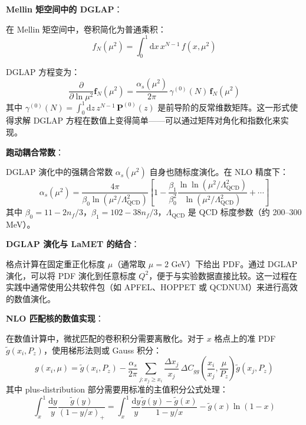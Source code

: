 \documentclass[11pt,a4paper]{ctexart}
\begin{document}
\textbf{Mellin 矩空间中的 DGLAP}：

在 Mellin 矩空间中，卷积简化为普通乘积：
\begin{equation}
f_N(\mu^2) = \int_0^1 \mathrm{d}x \, x^{N-1} \, f(x, \mu^2)
\end{equation}

DGLAP 方程变为：
\begin{equation}
\frac{\partial}{\partial \ln \mu^2} \mathbf{f}_N(\mu^2) =
\frac{\alpha_s(\mu^2)}{2\pi} \, \gamma^{(0)}(N) \, \mathbf{f}_N(\mu^2)
\end{equation}
其中 $\gamma^{(0)}(N) = \int_0^1 \mathrm{d}z \, z^{N-1} \, \mathbf{P}^{(0)}(z)$ 是前导阶的反常维数矩阵。这一形式使得求解 DGLAP 方程在数值上变得简单——可以通过矩阵对角化和指数化来实现。

\textbf{跑动耦合常数}：

DGLAP 演化中的强耦合常数 $\alpha_s(\mu^2)$ 自身也随标度演化。在 NLO 精度下：
\begin{equation}
\alpha_s(\mu^2) = \frac{4\pi}{\beta_0 \ln(\mu^2/\Lambda_{\text{QCD}}^2)}
\left[ 1 - \frac{\beta_1}{\beta_0^2} \frac{\ln\ln(\mu^2/\Lambda_{\text{QCD}}^2)}{\ln(\mu^2/\Lambda_{\text{QCD}}^2)} + \cdots \right]
\end{equation}
其中 $\beta_0 = 11 - 2n_f/3$，$\beta_1 = 102 - 38n_f/3$，$\Lambda_{\text{QCD}}$ 是 QCD 标度参数（约 200--300 MeV）。

\textbf{DGLAP 演化与 LaMET 的结合}：

格点计算在固定重正化标度 $\mu$（通常取 $\mu = 2$ GeV）下给出 PDF。通过 DGLAP 演化，可以将 PDF 演化到任意标度 $Q^2$，便于与实验数据直接比较。这一过程在实践中通常使用公共软件包（如 APFEL、HOPPET 或 QCDNUM）来进行高效的数值演化。

\textbf{NLO 匹配核的数值实现}：

在数值计算中，微扰匹配的卷积积分需要离散化。对于 $x$ 格点上的准 PDF $\tilde{g}(x_i, P_z)$，使用梯形法则或 Gauss 积分：
\begin{equation}
g(x_i, \mu) = \tilde{g}(x_i, P_z) - \frac{\alpha_s}{2\pi}
\sum_{j: x_j \ge x_i} \frac{\Delta x_j}{x_j} \,
\Delta C_{gg}\!\left(\frac{x_i}{x_j}, \frac{\mu}{P_z}\right)
\tilde{g}(x_j, P_z)
\end{equation}
其中 plus-distribution 部分需要用标准的主值积分公式处理：
\begin{equation}
\int_{x}^{1} \frac{\mathrm{d}y}{y} \frac{\tilde{g}(y)}{(1-y/x)_+} =
\int_{x}^{1} \frac{\mathrm{d}y}{y} \frac{\tilde{g}(y) - \tilde{g}(x)}{1-y/x} -
\tilde{g}(x) \ln(1-x)
\end{equation}
\end{document}

